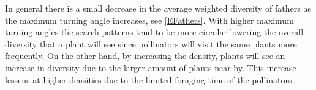 In general there is a small decrease in the average weighted diversity of
fathers as the maximum turning angle increases, see \autoref{EFathers}. With
higher maximum turning angles the search patterns tend to be more circular
lowering the overall diversity that a plant will see since pollinators will
visit the same plants more frequently.  On the other hand, by increasing the
density, plants will see an increase in diversity due to the larger amount of
plants near by.  This increase lessens at higher densities due to the limited
foraging time of the pollinators.
